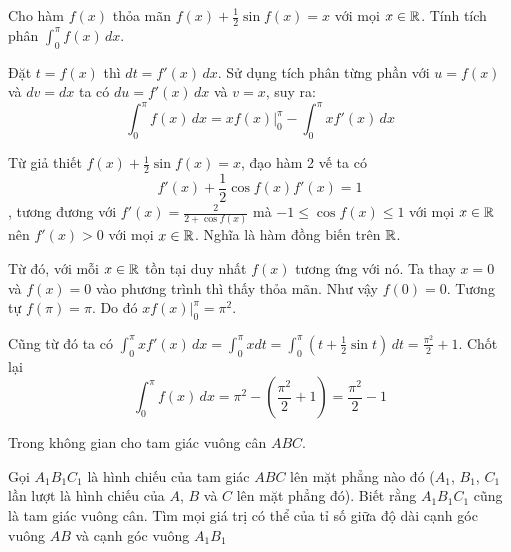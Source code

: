 \begin{problem}{5}
    Cho hàm $f(x)$ thỏa mãn $f(x) + \frac{1}{2} \sin f(x) = x$ với mọi
    $x \in \mathbb{R}$. Tính tích phân $\int_{0}^{\pi} f(x)\,dx$.
\end{problem}

\begin{solution}
    Đặt $t = f(x)$ thì $dt = f'(x)\,dx$. Sử dụng tích phân từng
    phần với $u = f(x)$ và $dv = dx$ ta có $du = f'(x)\,dx$ và
    $v = x$, suy ra:
    \[\int_{0}^{\pi} f(x)\,dx = x f(x) \Big|^\pi_0 - \int_{0}^{\pi}x f'(x)\,dx\]

    Từ giả thiết $f(x) + \frac{1}{2} \sin f(x) = x$, đạo hàm 2 vế
    ta có 
    \[f'(x) + \frac{1}{2} \cos f(x) f'(x) = 1\]
    , tương đương với
    $f'(x) = \frac{2}{2 + \cos f(x)}$ mà $-1 \leq \cos f(x) \leq 1$
    với mọi $x \in \mathbb{R}$ nên $f'(x) > 0$ với mọi $x \in \mathbb{R}$. Nghĩa
    là hàm đồng biến trên $\mathbb{R}$.

    Từ đó, với mỗi $x \in \mathbb{R}$ tồn tại duy nhất $f(x)$ tương ứng
    với nó. Ta thay $x = 0$ và $f(x) = 0$ vào phương trình thì 
    thấy thỏa mãn. Như vậy $f(0) = 0$. Tương tự $f(\pi) = \pi$.
    Do đó $x f(x) \Big|^\pi_0 = \pi^2$.

    Cũng từ đó ta có $\int_{0}^{\pi} x f'(x)\,dx = \int_{0}^{\pi} x dt
    = \int_{0}^{\pi} (t + \frac{1}{2} \sin t)\,dt = \frac{\pi^2}{2} + 1$.
    Chốt lại 
    \[\int_{0}^{\pi}f(x)\,dx = \pi^2 - (\frac{\pi^2}{2} + 1)
    = \frac{\pi^2}{2} - 1\]
\end{solution}

\begin{problem}{6}
    Trong không gian cho tam giác vuông cân $ABC$. 
    
    Gọi $A_1 B_1 C_1$ là hình chiếu của tam giác $ABC$ lên mặt phẳng nào đó ($A_1$, $B_1$, $C_1$
    lần lượt là hình chiếu của $A$, $B$ và $C$ lên mặt phẳng đó).
    Biết rằng $A_1 B_1 C_1$ cũng là tam giác vuông cân. Tìm mọi giá
    trị có thể của tỉ số giữa độ dài cạnh góc vuông $AB$ và cạnh
    góc vuông $A_1 B_1$
\end{problem}

